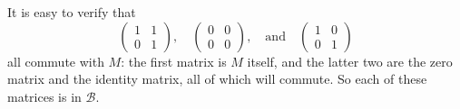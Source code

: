 \begin{solution}
  It is easy to verify that
  \begin{equation*}
    \begin{pmatrix}
      1 & 1\\
      0 & 1
    \end{pmatrix},\quad
    \begin{pmatrix}
      0 & 0\\
      0 & 0
    \end{pmatrix},\quad\text{and}\quad
    \begin{pmatrix}
      1 & 0\\
      0 & 1
    \end{pmatrix}
  \end{equation*}
  all commute with $M$: the first matrix is $M$ itself, and the latter
  two are the zero matrix and the identity matrix, all of which will
  commute. So each of these matrices is in $\mathcal{B}$.


\end{solution}
